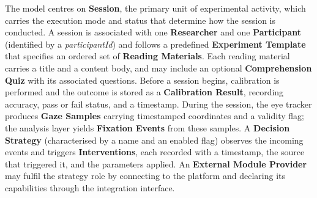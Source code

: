 The model centres on \textbf{Session}, the primary unit of experimental activity,
which carries the execution mode and status that determine how the session
is conducted.
A session is associated with one \textbf{Researcher} and one \textbf{Participant}
(identified by a \textit{participantId}) and follows a predefined
\textbf{Experiment Template} that specifies an ordered set of
\textbf{Reading Materials}.
Each reading material carries a title and a content body, and may include
an optional \textbf{Comprehension Quiz} with its associated questions.
Before a session begins, calibration is performed and the outcome is stored as
a \textbf{Calibration Result}, recording accuracy, pass or fail status, and a
timestamp.
During the session, the eye tracker produces \textbf{Gaze Samples} carrying
timestamped coordinates and a validity flag; the analysis layer yields
\textbf{Fixation Events} from these samples.
A \textbf{Decision Strategy} (characterised by a name and an enabled flag)
observes the incoming events and triggers \textbf{Interventions}, each recorded
with a timestamp, the source that triggered it, and the parameters applied.
An \textbf{External Module Provider} may fulfil the strategy role by connecting
to the platform and declaring its capabilities through the integration interface.
